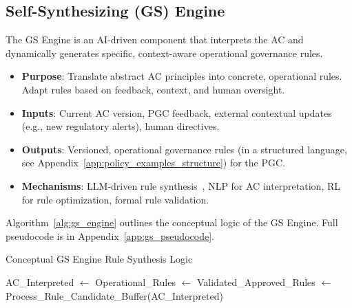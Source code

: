 \documentclass[sigconf,review,anonymous=false]{acmart} %
\begin{document}
\subsection{Self-Synthesizing (GS) Engine}
The GS Engine is an AI-driven component that interprets the AC and dynamically generates specific, context-aware operational governance rules.
\begin{itemize}
    \item \textbf{Purpose}: Translate abstract AC principles into concrete, operational rules. Adapt rules based on feedback, context, and human oversight.
    \item \textbf{Inputs}: Current AC version, PGC feedback, external contextual updates (e.g., new regulatory alerts), human directives.
    \item \textbf{Outputs}: Versioned, operational governance rules (in a structured language, see Appendix~\ref{app:policy_examples_structure}) for the PGC.
    \item \textbf{Mechanisms}: LLM-driven rule synthesis~\cite{BaiConstitutionalAI22, LianProgent25}, NLP for AC interpretation, RL for rule optimization, formal rule validation.
\end{itemize}
Algorithm~\ref{alg:gs_engine} outlines the conceptual logic of the GS Engine. Full pseudocode is in Appendix~\ref{app:gs_pseudocode}.

\begin{algorithm}[t]
\DontPrintSemicolon
\caption{Conceptual GS Engine Rule Synthesis Logic}\label{alg:gs_engine}
\BlankLine
AC\_Interpreted $\leftarrow$ \;
Operational\_Rules $\leftarrow$ \LoadExistingRules{}\;
\BlankLine
{}
Validated\_Approved\_Rules $\leftarrow$ Process\_Rule\_Candidate\_Buffer(AC\_Interpreted)\;
\end{algorithm}
\end{document}
